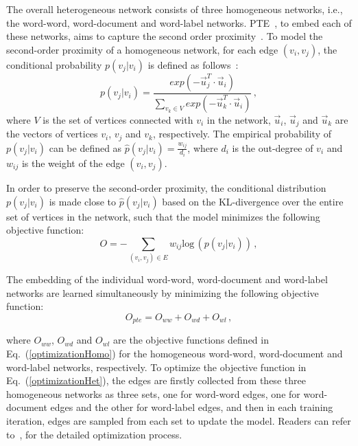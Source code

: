 \begin{itemize}
The overall heterogeneous network consists of three homogeneous networks, i.e., the word-word, word-document and word-label networks. PTE~\cite{PTE}, to embed each of these networks, aims to capture the second order proximity~\cite{tang2015line}.
To model the second-order proximity of a homogeneous network, for each edge $(v_i,v_j)$, the conditional probability $p(v_{j}|v_{i})$ is defined as follows~\cite{tang2015line}: 
\begin{equation}
p(v_{j}|v_{i})=\frac{exp(-\vec{u}_{j}^{T}\cdot\vec{u}_{i})}{\sum\limits_{v_k\in V} exp(-\vec{u}_{k}^{T}\cdot\vec{u}_{i})}\,,
\end{equation}
where $V$ is the set of vertices connected with $v_i$ in the network, $\vec{u}_{i}$, $\vec{u}_{j}$ and $\vec{u}_{k}$ are the vectors of vertices $v_i$, $v_j$ and $v_k$, respectively. The empirical probability of $p(v_{j}|v_{i})$ can be defined as $\hat{p}(v_j|v_i)=\frac{w_{ij}}{d_i}$, where $d_i$ is the out-degree of $v_i$ and $w_{ij}$ is the weight of the edge $(v_i,v_j)$.

In order to preserve the second-order proximity, the conditional distribution $p(v_{j}|v_{i})$ is made close to $\hat{p}(v_{j}|v_{i})$ based on the KL-divergence over the entire set of vertices in the network, such that the model minimizes the following objective function:
\begin{equation}\label{optimizationHomo}
O=-\sum_{(v_i,v_j) \in E}w_{ij} \textrm{log} \,(p(v_{j}|v_{i}))\,,
\end{equation}

The embedding of the individual word-word, word-document and word-label networks are learned simultaneously by minimizing the following objective function:
 \begin{equation}\label{optimizationHet}
 O_{pte}={O}_{ww}+{O}_{wd}+{O}_{wl}\,,
 \end{equation}

where ${O}_{ww}$, ${O}_{wd}$ and ${O}_{wl}$ are the objective functions defined in Eq.~(\ref{optimizationHomo}) for the homogeneous word-word, word-document and word-label networks, respectively. 
To optimize the objective function in Eq.~(\ref{optimizationHet}), the edges are firstly collected from these three homogeneous networks as three sets, one for word-word edges, one for word-document edges and the other for word-label edges, and then in each training iteration, edges are sampled from each set to update the model. Readers can refer to~\cite{PTE,LINE}, for the detailed optimization process.


\end{itemize}
